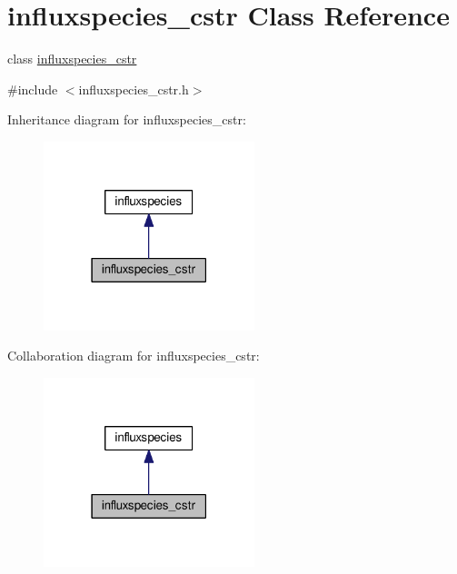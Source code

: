 \hypertarget{a00014}{\section{influxspecies\-\_\-cstr Class Reference}
\label{a00014}
}


class \hyperlink{a00014}{influxspecies\-\_\-cstr}  




{\ttfamily \#include $<$influxspecies\-\_\-cstr.\-h$>$}



Inheritance diagram for influxspecies\-\_\-cstr\-:\nopagebreak
\begin{figure}[H]
\begin{center}
\leavevmode
\includegraphics[width=174pt]{a00091}
\end{center}
\end{figure}


Collaboration diagram for influxspecies\-\_\-cstr\-:\nopagebreak
\begin{figure}[H]
\begin{center}
\leavevmode
\includegraphics[width=174pt]{a00092}
\end{center}
\end{figure}
